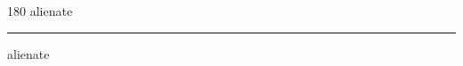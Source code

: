 
\begin{frame}
\begin{center}
\begin{turn}{180}
{\fontsize{2.5cm}{1em}\selectfont alienate}
\end{turn}
\vspace{1em}\par  
\hrule
\vspace{1em}\par  
{\fontsize{2.5cm}{1em}\selectfont alienate}
\end{center}
\end{frame}
